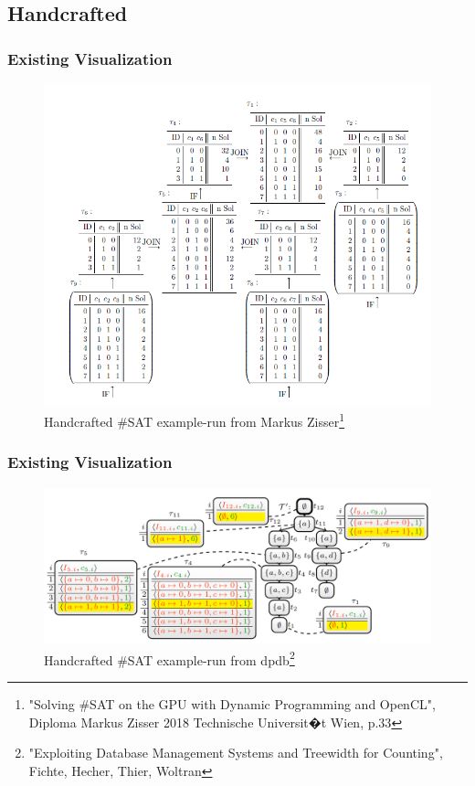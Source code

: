 \documentclass[c,8pt,xcolor...,x11names]{beamer}
\begin{document}
\subsection{Handcrafted}
\begin{frame}
	\frametitle{Existing Visualization}
	\begin{figure}
		\centering
		\includegraphics[width=0.6\linewidth]{images/DualDA43.png}
		\caption{Handcrafted \#SAT example-run from Markus Zisser\footnote{"Solving \#SAT on the GPU with Dynamic Programming and OpenCL",\\ Diploma Markus Zisser 2018 Technische Universit�t Wien, p.33}}
		\label{fig:dualda43}
	\end{figure}

\end{frame}
\begin{frame}
	\frametitle{Existing Visualization}
	\begin{figure}
		\centering
		\includegraphics[width=\linewidth]{images/dpdbVisuSat.png}
		\caption{Handcrafted \#SAT example-run from dpdb\footnote{"Exploiting Database Management Systems and Treewidth for Counting",\\ Fichte, Hecher, Thier, Woltran} }
		\label{fig:dpdbVisuSat}
	\end{figure}


\end{frame}
\end{document}
